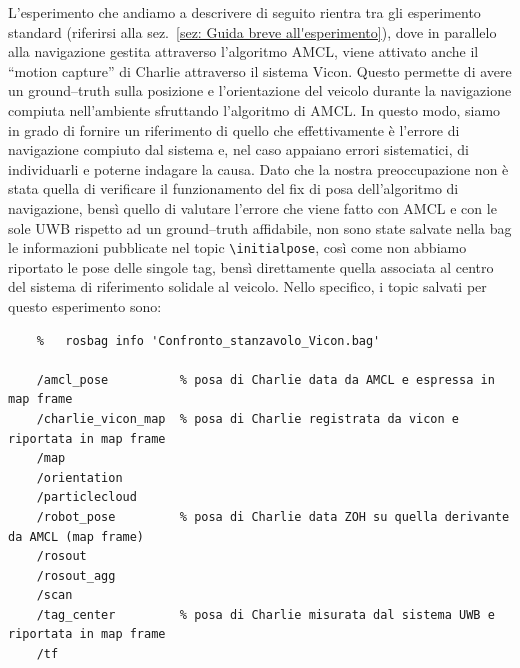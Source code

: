 L'esperimento che andiamo a descrivere di seguito rientra tra gli esperimento standard (riferirsi alla sez.~\ref{sez: Guida breve all'esperimento}), dove in parallelo alla navigazione gestita attraverso l'algoritmo AMCL, viene attivato anche il ``motion capture''
di Charlie attraverso il sistema Vicon. Questo permette di avere un ground--truth sulla posizione e l'orientazione del veicolo durante la navigazione compiuta
nell'ambiente sfruttando l'algoritmo di AMCL. In questo modo, siamo in grado di fornire un riferimento di quello che effettivamente è l'errore di navigazione compiuto dal sistema e, nel caso appaiano errori sistematici, di individuarli e poterne indagare la causa.
Dato che la nostra preoccupazione non è stata quella di verificare il funzionamento del fix di posa dell'algoritmo di navigazione, bensì quello di valutare l'errore che viene fatto con AMCL e con le sole UWB rispetto ad un ground--truth affidabile, non sono state salvate nella bag le informazioni pubblicate nel topic \verb|\initialpose|, così come non abbiamo riportato le pose delle singole tag, bensì direttamente quella associata al centro del sistema di riferimento solidale al veicolo.
Nello specifico, i topic salvati per questo esperimento sono:
\begin{verbatim}
	%	rosbag info 'Confronto_stanzavolo_Vicon.bag'
	
	/amcl_pose			% posa di Charlie data da AMCL e espressa in map frame 
	/charlie_vicon_map	% posa di Charlie registrata da vicon e riportata in map frame
	/map
	/orientation
	/particlecloud
	/robot_pose			% posa di Charlie data ZOH su quella derivante da AMCL (map frame)
	/rosout
	/rosout_agg
	/scan   
	/tag_center			% posa di Charlie misurata dal sistema UWB e riportata in map frame
	/tf     
	
\end{verbatim}

